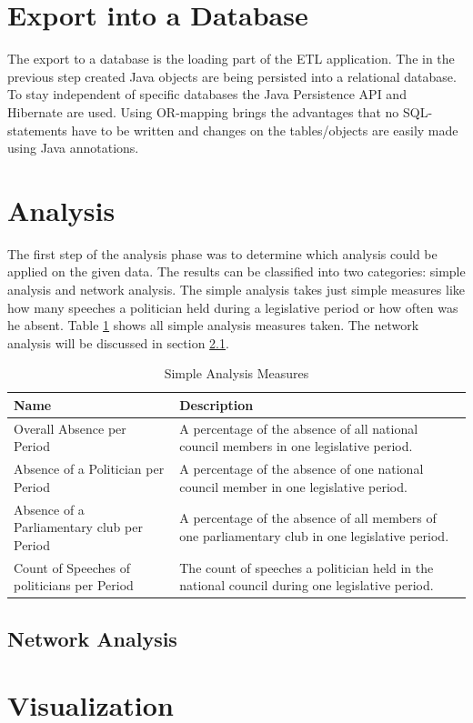 \section{Export into a Database}
\label{sec:export_db}
The export to a database is the loading part of the ETL application. The in the previous step created Java objects are being persisted into a relational database. To stay independent of specific databases the Java Persistence API and Hibernate are used. Using OR-mapping brings the advantages that no SQL-statements have to be written and changes on the tables/objects are easily made using Java annotations.

\section{Analysis}
\label{sec:analysis}

The first step of the analysis phase was to determine which analysis could be applied on the given data. The results can be classified into two categories: simple analysis and network analysis. The simple analysis takes just simple measures like how many speeches a politician held during a legislative period or how often was he absent. Table \ref{table:simple_analysis} shows all simple analysis measures taken. The network analysis will be discussed in section \ref{sec:network_analysis}.

\begin{table}
\begin{tabular}{| p{5cm} | p{8cm} |}
\hline
  Name & Description \\
\hline
\hline
  Overall Absence per Period & A percentage of the absence of all national council members in one legislative period. \\
\hline
Absence of a Politician per Period & A percentage of the absence of one national council member in one legislative period. \\
\hline
Absence of a Parliamentary club per Period & A percentage of the absence of all members of one parliamentary club in one legislative period. \\
\hline
Count of Speeches of politicians per Period & The count of speeches a politician held in the national council during one legislative period. \\
\hline

\end{tabular}

\caption{Simple Analysis Measures}
\label{table:simple_analysis}
\end{table}

\subsection{Network Analysis}
\label{sec:network_analysis}

\section{Visualization}
\label{sec:visualization}
